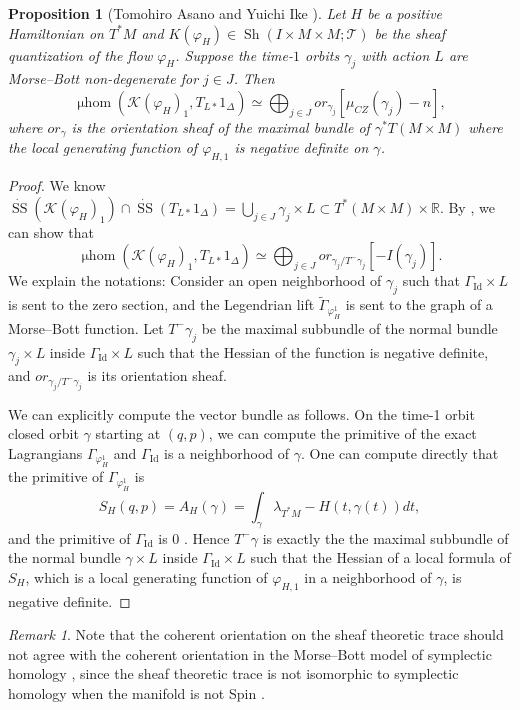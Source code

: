 \documentclass[11pt]{amsart}
\numberwithin{equation}{section}
\theoremstyle{plain}
\newtheorem{Prop}[prop]{Proposition}
\theoremstyle{definition}
\theoremstyle{remark}
\newtheorem{RMK}[rmk]{Remark}
\newcommand{\bR} { {\mathbb{R}}}
\newcommand{\cK} { {\mathcal{K}}}
\newcommand{\sT} { {\mathscr{T}}}
\newcommand{\Id}{{\operatorname{Id}}}
\newcommand{\Sh} { {\operatorname{Sh}}}
\newcommand\mhom{\operatorname{\mu hom}}
\newcommand\ms{\operatorname{SS}}
\begin{document}
\begin{Prop}[{Tomohiro Asano and Yuichi Ike \cite[Proposition 4.15 \& Theorem B.6]{Ike_2019}}]\label{prop: mhom CZ index}
Let $H$ be a positive Hamiltonian on $T^*M$ and $K(\varphi_H) \in \Sh(I \times M \times M; \sT)$ be the sheaf quantization of the flow $\varphi_H$. Suppose the time-$1$ orbits $\gamma_j$ with action $L$ are Morse--Bott non-degenerate for $j \in J$.
Then
\[\mhom(\cK(\varphi_H)_1, T_{L*}1_\Delta) \simeq \bigoplus_{j\in J}or_{\gamma_j}[\mu_{CZ}(\gamma_j)-n],\]
where $or_{\gamma}$ is the orientation sheaf of the maximal bundle of $\gamma^*T(M \times M)$ where the local generating function of $\varphi_{H,1}$ is negative definite on $\gamma$.
\end{Prop}
\begin{proof}
We know $\dot{\ms}(\cK(\varphi_H)_1) \cap \dot{\ms}(T_{L*}1_\Delta) = \bigcup_{j\in J}\gamma_j \times L \subset T^*(M \times M) \times \bR$. By \cite[Proposition 4.15 \& Theorem C.6]{Ike_2019}, we can show that
\[\mhom(\cK(\varphi_H)_1, T_{L*}1_\Delta) \simeq \bigoplus_{j\in J}or_{\gamma_j/T^-\gamma_j}[-I(\gamma_j)].\]
We explain the notations: Consider an open neighborhood of $\gamma_j$ such that $\Gamma_\Id \times L$ is sent to the zero section, and the Legendrian lift $\widetilde\Gamma_{\varphi_H^1}$ is sent to the graph of a Morse--Bott function. Let $T^-\gamma_j$ be the maximal subbundle of the normal bundle $\gamma_j \times L$ inside $\Gamma_\Id \times L$ such that the Hessian of the function is negative definite, and $or_{\gamma_j/T^-\gamma_j}$ is its orientation sheaf.

We can explicitly compute the vector bundle as follows. On the time-1 orbit closed orbit $\gamma$ starting at $(q,p)$, we can compute the primitive of the exact Lagrangians $\Gamma_{\varphi_H^1}$ and $\Gamma_\Id$ is a neighborhood of $\gamma$. One can compute directly that the primitive of $\Gamma_{\varphi_H^1}$ is
\[S_H(q,p)=A_H(\gamma) = \int_{\gamma} \lambda_{T^*M} - H(t, \gamma(t))dt,\]
and the primitive of $\Gamma_\Id$ is $0$ \cite[Proposition 9.19]{mcduff2017introST}. 
Hence $T^-\gamma$  is exactly the the maximal subbundle of the normal bundle $\gamma \times L$ inside $\Gamma_\Id \times L$ such that the Hessian of a local formula of $S_H$, which is a local generating function of $\varphi_{H,1}$ in a neighborhood of $\gamma$, is negative definite.
\end{proof}
\begin{RMK}
Note that the coherent orientation on the sheaf theoretic trace should not agree with the coherent orientation in the Morse--Bott model of symplectic homology \cite[Section 4.4]{Bourgeois-Oancea-automomous}, since the sheaf theoretic trace is not isomorphic to  symplectic homology when the manifold is not Spin \cite[Appendix B]{guillermouviterbo_gammasupport}.
\end{RMK}
\end{document}
